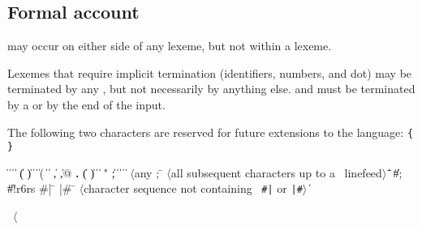 \subsection{Formal account}
\label{lexicalgrammarsection}

 may occur on either side of any lexeme, but not
within a lexeme.

\vest Lexemes that require implicit termination (identifiers, numbers,
and dot) may be terminated by any , but not
necessarily by anything else.   and 
must be terminated by a  or by the end of the input.

The following two characters are reserved for future extensions to the
language: {\tt \verb"{" \verb"}"}

\begin{grammar}%
 \:  \|  \| 
\>  \|  \| 
\>  \| ( \| ) \| \openbracket{} \| \closedbracket{} \| \sharpsign( \| \singlequote{} \| \backquote{} \| , \| ,@ \| {\bf.}
 \:  \| ( \| ) \| \openbracket{} \| \closedbracket{} " \| ;
 \:  \| 
\> \|  \|  
\> \| 
 \: $\langle${\rm any }
\> 
 \: ; \= $\langle$\rm all subsequent characters up to a
                    \>\ \rm linefeed$\rangle$
\qquad \= \| 
\> \| \#; 
\> \| \#!r6rs
 \: \#| \= 
\>  |\#
 \: \= $\langle$\rm character sequence not containing
\>\ \rm {\tt \#|} or {\tt |\#}$\rangle$
 \:  
 \:  \| 
 \: %
\end{grammar}

\label{extendedalphas}
\label{identifiersyntax}

\hbox{\cf{} \goesto{} $\langle$}

